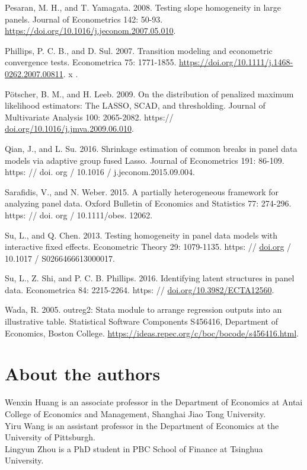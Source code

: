 \documentclass[10pt]{article}
\begin{document}
Pesaran, M. H., and T. Yamagata. 2008. Testing slope homogeneity in large panels. Journal of Econometrics 142: 50-93. \href{https://doi.org/10.1016/j.jeconom.2007.05.010}{https://doi.org/10.1016/j.jeconom.2007.05.010}.

Phillips, P. C. B., and D. Sul. 2007. Transition modeling and econometric convergence tests. Econometrica 75: 1771-1855. \href{https://doi.org/10.1111/j.1468-0262.2007.00811}{https://doi.org/10.1111/j.1468-0262.2007.00811}. x .

Pötscher, B. M., and H. Leeb. 2009. On the distribution of penalized maximum likelihood estimators: The LASSO, SCAD, and thresholding. Journal of Multivariate Analysis 100: 2065-2082. https:// \href{http://doi.org/10.1016/j.jmva.2009.06.010}{doi.org/10.1016/j.jmva.2009.06.010}.

Qian, J., and L. Su. 2016. Shrinkage estimation of common breaks in panel data models via adaptive group fused Lasso. Journal of Econometrics 191: 86-109. https: // doi. org / 10.1016 / j.jeconom.2015.09.004.

Sarafidis, V., and N. Weber. 2015. A partially heterogeneous framework for analyzing panel data. Oxford Bulletin of Economics and Statistics 77: 274-296. https: // doi. org / 10.1111/obes. 12062.

Su, L., and Q. Chen. 2013. Testing homogeneity in panel data models with interactive fixed effects. Econometric Theory 29: 1079-1135. https: // \href{http://doi.org}{doi.org} / 10.1017 / S0266466613000017.

Su, L., Z. Shi, and P. C. B. Phillips. 2016. Identifying latent structures in panel data. Econometrica 84: 2215-2264. https: // \href{http://doi.org/10.3982/ECTA12560}{doi.org/10.3982/ECTA12560}.

Wada, R. 2005. outreg2: Stata module to arrange regression outputs into an illustrative table. Statistical Software Components S456416, Department of Economics, Boston College. \href{https://ideas.repec.org/c/boc/bocode/s456416.html}{https://ideas.repec.org/c/boc/bocode/s456416.html}.

\section*{About the authors}
Wenxin Huang is an associate professor in the Department of Economics at Antai College of Economics and Management, Shanghai Jiao Tong University.\\
Yiru Wang is an assistant professor in the Department of Economics at the University of Pittsburgh.\\
Lingyun Zhou is a PhD student in PBC School of Finance at Tsinghua University.
\end{document}
